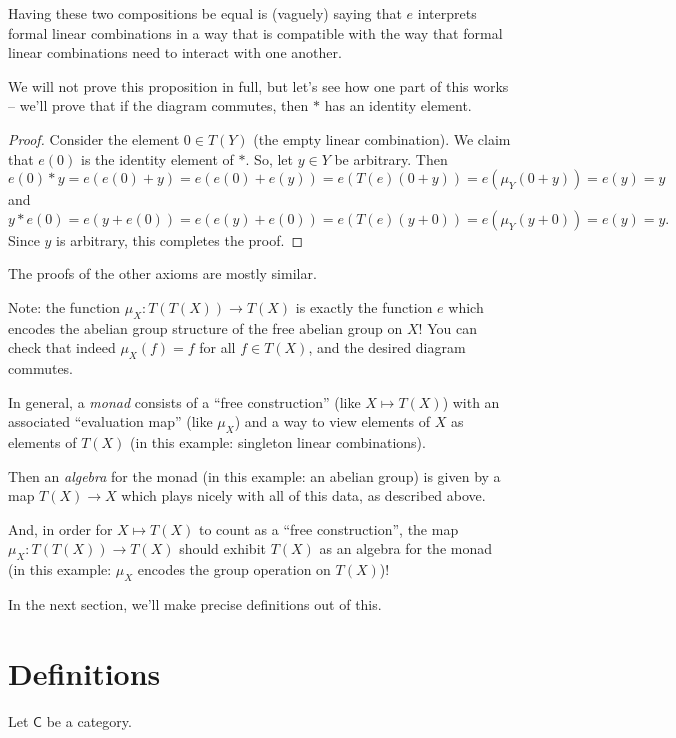 \documentclass{article}
\theoremstyle{definition}
\newcommand{\C}{\mathsf{C}}
\begin{document}
Having these two compositions be equal is (vaguely) saying that $e$ interprets formal linear combinations in a way that is compatible with the way that formal linear combinations need to interact with one another.

We will not prove this proposition in full, but let's see how one part of this works -- we'll prove that if the diagram commutes, then $*$ has an identity element.

\begin{proof}
Consider the element $0 \in T(Y)$ (the empty linear combination). We claim that $e(0)$ is the identity element of $*$. So, let $y \in Y$ be arbitrary. Then
$$e(0) * y = e(e(0) + y) = e(e(0) + e(y)) = e(T(e)(0+y)) = e(\mu_Y(0+y)) = e(y) = y$$
and
$$y * e(0) = e(y + e(0)) = e(e(y) + e(0)) = e(T(e)(y+0)) = e(\mu_Y(y+0)) = e(y) = y.$$
Since $y$ is arbitrary, this completes the proof.
\end{proof}

The proofs of the other axioms are mostly similar.

Note: the function $\mu_X : T(T(X)) \to T(X)$ is exactly the function $e$ which encodes the abelian group structure of the free abelian group on $X$! You can check that indeed $\mu_X(f) = f$ for all $f \in T(X)$, and the desired diagram commutes.

In general, a \emph{monad} consists of a ``free construction'' (like $X \mapsto T(X)$) with an associated ``evaluation map'' (like $\mu_X$) and a way to view elements of $X$ as elements of $T(X)$ (in this example: singleton linear combinations).

Then an \emph{algebra} for the monad (in this example: an abelian group) is given by a map $T(X) \to X$ which plays nicely with all of this data, as described above.

And, in order for $X \mapsto T(X)$ to count as a ``free construction'', the map $\mu_X : T(T(X)) \to T(X)$ should exhibit $T(X)$ as an algebra for the monad (in this example: $\mu_X$ encodes the group operation on $T(X)$)!

In the next section, we'll make precise definitions out of this.

\section{Definitions}

Let $\C$ be a category.
\end{document}
